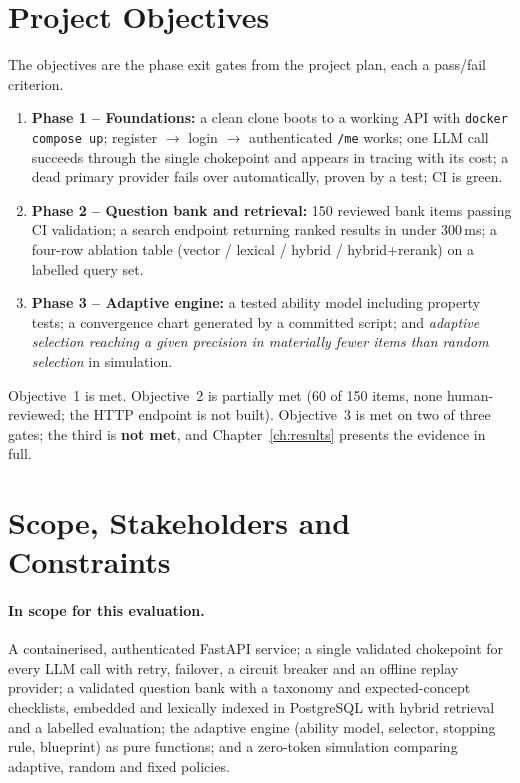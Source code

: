 \documentclass{tietreport}
\begin{document}
\section{Project Objectives}

The objectives are the phase exit gates from the project plan, each a pass/fail criterion.
\begin{enumerate}
  \item \textbf{Phase 1 -- Foundations:} a clean clone boots to a working API with
    \texttt{docker compose up}; register $\to$ login $\to$ authenticated \texttt{/me} works; one
    LLM call succeeds through the single chokepoint and appears in tracing with its cost; a dead
    primary provider fails over automatically, proven by a test; CI is green.
  \item \textbf{Phase 2 -- Question bank and retrieval:} 150 reviewed bank items passing CI
    validation; a search endpoint returning ranked results in under 300\,ms; a four-row ablation
    table (vector / lexical / hybrid / hybrid+rerank) on a labelled query set.
  \item \textbf{Phase 3 -- Adaptive engine:} a tested ability model including property tests; a
    convergence chart generated by a committed script; and \emph{adaptive selection reaching a
    given precision in materially fewer items than random selection} in simulation.
\end{enumerate}
Objective~1 is met. Objective~2 is partially met (60 of 150 items, none human-reviewed; the
HTTP endpoint is not built). Objective~3 is met on two of three gates; the third is
\textbf{not met}, and Chapter~\ref{ch:results} presents the evidence in full.

\section{Scope, Stakeholders and Constraints}

\paragraph{In scope for this evaluation.} A containerised, authenticated FastAPI service; a
single validated chokepoint for every LLM call with retry, failover, a circuit breaker and an
offline replay provider; a validated question bank with a taxonomy and expected-concept
checklists, embedded and lexically indexed in PostgreSQL with hybrid retrieval and a labelled
evaluation; the adaptive engine (ability model, selector, stopping rule, blueprint) as pure
functions; and a zero-token simulation comparing adaptive, random and fixed policies.
\end{document}
